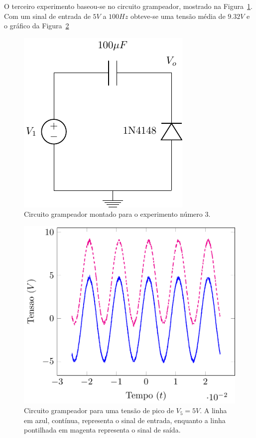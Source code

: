 \documentclass[12pt,a4paper]{article}
\begin{document}
O terceiro experimento baseou-se no circuito grampeador, mostrado na Figura~\ref{fig:circ_grampeador}. Com um sinal de entrada de $5V$ a $100Hz$ obteve-se uma tensão média de $9.32V$ e o gráfico da Figura~\ref{fig:grampeador}
\begin{figure}[htpb]
  \centering
  \includegraphics{circ_grampeador.pdf}
  \caption{Circuito grampeador montado para o experimento número 3.}
  \label{fig:circ_grampeador}
\end{figure}
\begin{figure}[htpb]
  \centering
  \includegraphics[width=0.8\linewidth]{./grampeador.pdf}
  \caption{Circuito grampeador para uma tensão de pico de $V_5=5V$. A linha em azul, contínua, representa o sinal de entrada, enquanto a linha pontilhada em magenta representa o sinal de saída.}
  \label{fig:grampeador}
\end{figure}
\newpage
\end{document}
